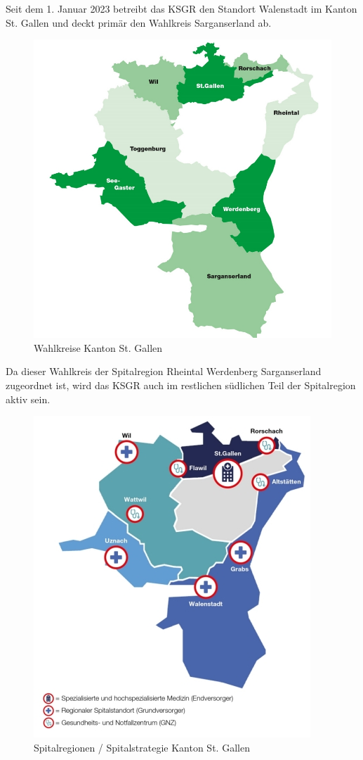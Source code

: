 Seit dem 1. Januar 2023 betreibt das KSGR den Standort Walenstadt im Kanton St. Gallen und deckt primär den Wahlkreis Sarganserland ab.
\begin{figure}[H]
    \centering
    \includegraphics[width=0.75\linewidth]{source/introduction/initial_situation/sg_wahlkreise}
    \caption{Wahlkreise Kanton St. Gallen\cite{LEZ4SPDD}}
    \label{fig:sg_wahlkreise}
\end{figure}

Da dieser Wahlkreis der Spitalregion Rheintal Werdenberg Sarganserland zugeordnet ist, wird das KSGR auch im restlichen südlichen Teil der Spitalregion aktiv sein.
\begin{figure}[H]
    \centering
    \includegraphics[width=0.5\linewidth]{source/introduction/initial_situation/sg_spitalregionen}
    \caption{Spitalregionen / Spitalstrategie Kanton St. Gallen\cite{3L8EIPUP}}
    \label{fig:sg_spitalregionen}
\end{figure}
